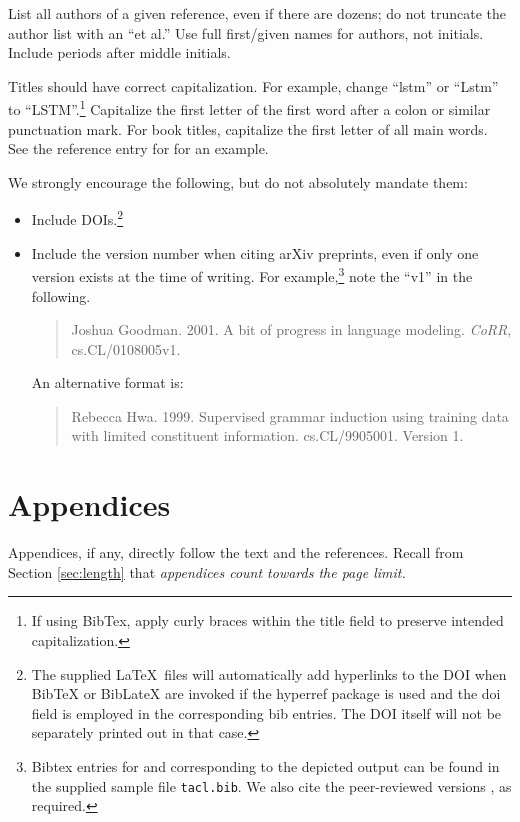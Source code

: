 \documentclass[11pt,a4paper]{article}
\begin{document}
List all authors of a given reference, even if there are dozens; do not
truncate the author list with an ``et al.''  Use full first/given names for
authors, not initials.  Include periods after middle initials.

Titles should have correct capitalization.  For example, change
``lstm'' or ``Lstm'' to ``LSTM''.\footnote{If using BibTex, apply curly braces
within the title field to preserve intended capitalization.}   Capitalize the
first letter of the first word after a colon or similar punctuation mark.  For
book titles, capitalize the first letter of all main words.  See the
reference entry for \citet{Jurafsky+Martin:2009a} for an example.


We strongly encourage the following, but do not absolutely mandate them:
\begin{itemize}
\item Include DOIs.\footnote{The supplied \LaTeX\ files will
automatically add hyperlinks to the DOI when BibTeX or
BibLateX are invoked if the hyperref package is used and
the doi field is employed in the corresponding bib entries.
The DOI itself will not be separately printed out in that case.}
\item Include the version number when citing arXiv preprints, even if only one
version exists at the time of writing.
For example,\footnote{Bibtex entries for \citet{DBLP:journals/corr/cs-CL-0108005} and
\citet{DBLP:journals/corr/cs-CL-9905001} corresponding to the depicted output
can be found in the supplied sample file {\tt tacl.bib}.  We also cite
the peer-reviewed versions \cite{GOODMAN2001403,P99-1010}, as required.}
note the ``v1'' in the following.
\begin{quote}
Joshua Goodman.  2001.  A bit of progress in language modeling. {\it CoRR},
cs.CL/0108005v1.
\end{quote}
An alternative format is:
\begin{quote}
Rebecca Hwa. 1999. Supervised grammar induction using training data with limited constituent
information. {cs.CL/9905001}. Version 1.
\end{quote}
\end{itemize}

\section{Appendices} Appendices, if any, directly follow the text and the
references.  Recall from Section \ref{sec:length} that {\em appendices count
towards the page
limit.}
\end{document}
